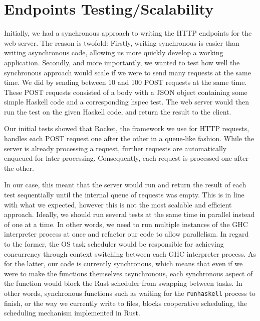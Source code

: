 \section{Endpoints Testing/Scalability}
Initially, we had a synchronous approach to writing the HTTP endpoints for the web server.
The reason is twofold: Firstly, writing synchronous is easier than writing asynchronous code, allowing us more quickly develop a working application. 
Secondly, and more importantly, we wanted to test how well the synchronous approach would scale if we were to send many requests at the same time.
We did by sending between 10 and 100 POST requests at the same time.
These POST requests consisted of a body with a JSON object containing some simple Haskell code and a corresponding hspec test.
The web server would then run the test on the given Haskell code, and return the result to the client.


Our initial tests showed that Rocket, the framework we use for HTTP requests, handles each POST request one after the other in a queue-like fashion.
While the server is already processing a request, further requests are automatically enqueued for later processing.
Consequently, each request is processed one after the other.


In our case, this meant that the server would run and return the result of each test sequentially until the internal queue of requests was empty.
This is in line with what we expected, however this is not the most scalable and efficient approach.
Ideally, we should run several tests at the same time in parallel instead of one at a time.
In other words, we need to run multiple instances of the GHC interpreter process at once and refactor our code to allow parallelism.
In regard to the former, the OS task scheduler would be responsible for achieving concurrency through context switching between each GHC interpreter process.
As for the latter, our code is currently synchronous, which means that even if we were to make the functions themselves asynchronous, each synchronous aspect of the function would block the Rust scheduler from swapping between tasks.
In other words, synchronous functions such as waiting for the \texttt{runhaskell} process to finish, or the way we currently write to files, blocks cooperative scheduling, the scheduling mechanism implemented in Rust.
